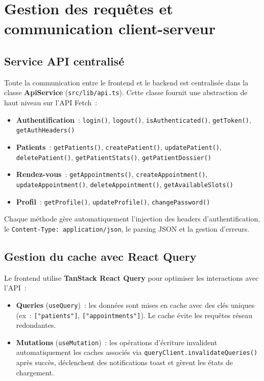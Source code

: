 \section{Gestion des requêtes et communication client-serveur}

\subsection{Service API centralisé}

Toute la communication entre le frontend et le backend est centralisée dans la classe \textbf{ApiService} (\texttt{src/lib/api.ts}). Cette classe fournit une abstraction de haut niveau sur l'API Fetch~:

\begin{itemize}
    \item \textbf{Authentification}~: \texttt{login()}, \texttt{logout()}, \texttt{isAuthenticated()}, \texttt{getToken()}, \texttt{getAuthHeaders()}
    \item \textbf{Patients}~: \texttt{getPatients()}, \texttt{createPatient()}, \texttt{updatePatient()}, \texttt{deletePatient()}, \texttt{getPatientStats()}, \texttt{getPatientDossier()}
    \item \textbf{Rendez-vous}~: \texttt{getAppointments()}, \texttt{createAppointment()}, \texttt{updateAppointment()}, \texttt{deleteAppointment()}, \texttt{getAvailableSlots()}
    \item \textbf{Profil}~: \texttt{getProfile()}, \texttt{updateProfile()}, \texttt{changePassword()}
\end{itemize}

Chaque méthode gère automatiquement l'injection des headers d'authentification, le \texttt{Content-Type: application/json}, le parsing JSON et la gestion d'erreurs.

\subsection{Gestion du cache avec React Query}

Le frontend utilise \textbf{TanStack React Query} pour optimiser les interactions avec l'API~:

\begin{itemize}
    \item \textbf{Queries} (\texttt{useQuery})~: les données sont mises en cache avec des clés uniques (ex~: \texttt{["patients"]}, \texttt{["appointments"]}). Le cache évite les requêtes réseau redondantes.
    \item \textbf{Mutations} (\texttt{useMutation})~: les opérations d'écriture invalident automatiquement les caches associés via \texttt{queryClient.invalidateQueries()} après succès, déclenchent des notifications toast et gèrent les états de chargement.
\end{itemize}

